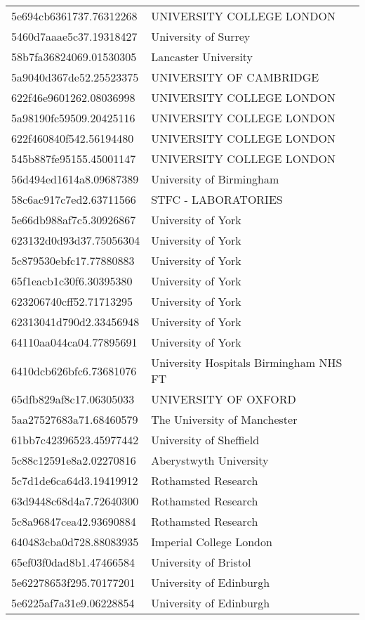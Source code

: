 \begin{tabular}{ll}
5e694cb6361737.76312268 & UNIVERSITY COLLEGE LONDON \\
5460d7aaae5c37.19318427 & University of Surrey \\
58b7fa36824069.01530305 & Lancaster University \\
5a9040d367de52.25523375 & UNIVERSITY OF CAMBRIDGE \\
622f46e9601262.08036998 & UNIVERSITY COLLEGE LONDON \\
5a98190fc59509.20425116 & UNIVERSITY COLLEGE LONDON \\
622f460840f542.56194480 & UNIVERSITY COLLEGE LONDON \\
545b887fe95155.45001147 & UNIVERSITY COLLEGE LONDON \\
56d494ed1614a8.09687389 & University of Birmingham \\
58c6ac917c7ed2.63711566 & STFC - LABORATORIES \\
5e66db988af7c5.30926867 & University of York \\
623132d0d93d37.75056304 & University of York \\
5c879530ebfc17.77880883 & University of York \\
65f1eacb1c30f6.30395380 & University of York \\
623206740cff52.71713295 & University of York \\
62313041d790d2.33456948 & University of York \\
64110aa044ca04.77895691 & University of York \\
6410dcb626bfc6.73681076 & University Hospitals Birmingham NHS FT \\
65dfb829af8c17.06305033 & UNIVERSITY OF OXFORD \\
5aa27527683a71.68460579 & The University of Manchester \\
61bb7c42396523.45977442 & University of Sheffield \\
5c88c12591e8a2.02270816 & Aberystwyth University \\
5c7d1de6ca64d3.19419912 & Rothamsted Research \\
63d9448c68d4a7.72640300 & Rothamsted Research \\
5c8a96847cea42.93690884 & Rothamsted Research \\
640483cba0d728.88083935 & Imperial College London \\
65ef03f0dad8b1.47466584 & University of Bristol \\
5e62278653f295.70177201 & University of Edinburgh \\
5e6225af7a31e9.06228854 & University of Edinburgh \\

\end{tabular}
